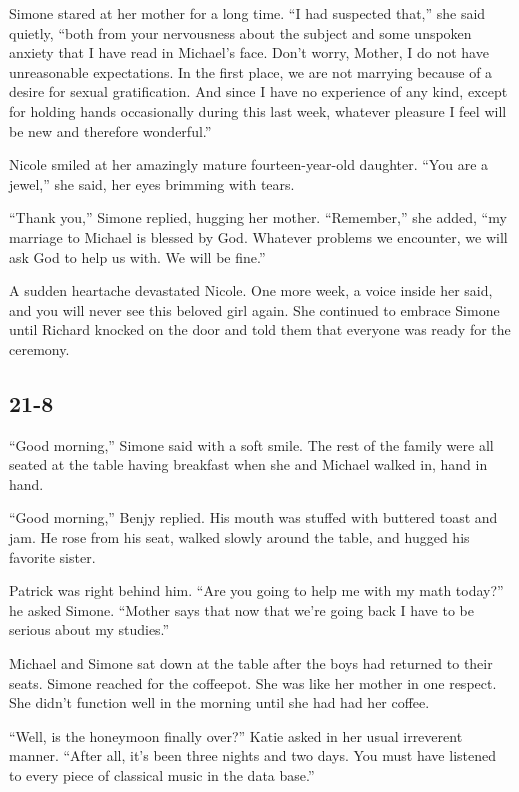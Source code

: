 \documentclass[]{article}
\begin{document}
{Simone stared at her mother for a long time.  “I had suspected that,” she said quietly, “both from your nervousness about the subject and some unspoken anxiety that I have read in Michael’s face.  Don’t worry, Mother, I do not have unreasonable expectations.  In the first place, we are not marrying because of a desire for sexual gratification.  And since I have no experience of any kind, except for holding hands occasionally during this last week, whatever pleasure I feel will be new and therefore wonderful.”

Nicole smiled at her amazingly mature fourteen-year-old daughter.  “You are a jewel,” she said, her eyes brimming with tears.

“Thank you,” Simone replied, hugging her mother.  “Remember,” she added, “my marriage to Michael is blessed by God.  Whatever problems we encounter, we will ask God to help us with.  We will be fine.”

A sudden heartache devastated Nicole.  One more week, a voice inside her said, and you will never see this beloved girl again.  She continued to embrace Simone until Richard knocked on the door and told them that everyone was ready for the ceremony.

\subsection*{21-8}

“Good morning,” Simone said with a soft smile.  The rest of the family were all seated at the table having breakfast when she and Michael walked in, hand in hand.

“Good morning,” Benjy replied.  His mouth was stuffed with buttered toast and jam.  He rose from his seat, walked slowly around the table, and hugged his favorite sister.

Patrick was right behind him.  “Are you going to help me with my math today?” he asked Simone.  “Mother says that now that we’re going back I have to be serious about my studies.”

Michael and Simone sat down at the table after the boys had returned to their seats.  Simone reached for the coffeepot.  She was like her mother in one respect.  She didn’t function well in the morning until she had had her coffee.

“Well, is the honeymoon finally over?” Katie asked in her usual irreverent manner.  “After all, it’s been three nights and two days.  You must have listened to every piece of classical music in the data base.”

}
\end{document}
